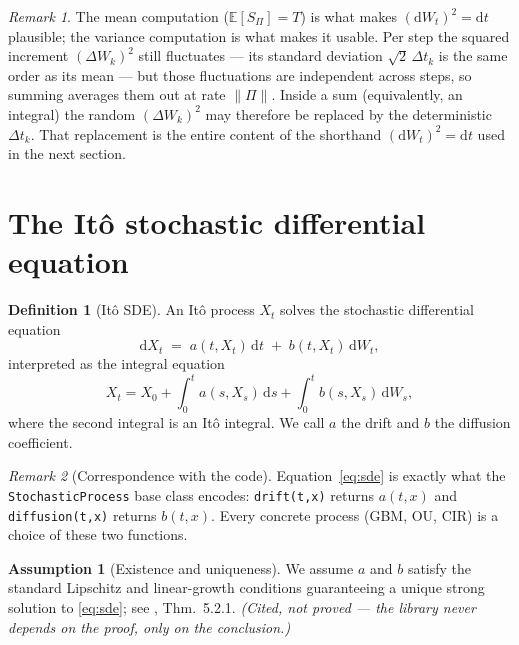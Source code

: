 \documentclass[11pt]{article}
\newcommand{\E}{\mathbb{E}}             %
\newcommand{\dd}{\mathrm{d}}           %
\newcommand{\dW}{\dd W_t}              %
\newcommand{\dt}{\dd t}                %
\newcommand{\drift}{a}                 %
\newcommand{\diff}{b}                  %
\theoremstyle{plain}
\theoremstyle{definition}
\newtheorem{definition}{Definition}
\newtheorem{assumption}{Assumption}
\theoremstyle{remark}
\newtheorem{remark}{Remark}
\begin{document}
\begin{remark}
The mean computation ($\E[S_\Pi]=T$) is what makes $(\dW)^2=\dt$
plausible; the variance computation is what makes it usable.
Per step the squared increment $(\Delta W_k)^2$ still fluctuates --- its
standard deviation $\sqrt2\,\Delta t_k$ is the same order as its mean --- but
those fluctuations are independent across steps, so summing averages them out
at rate $\|\Pi\|$. Inside a sum (equivalently, an integral) the random
$(\Delta W_k)^2$ may therefore be replaced by the deterministic $\Delta t_k$.
That replacement is the entire content of the shorthand $(\dW)^2=\dt$ used in
the next section.
\end{remark}

\section{The It\^o stochastic differential equation}

\begin{definition}[It\^o SDE]
An It\^o process $X_t$ solves the stochastic differential equation
\begin{equation}\label{eq:sde}
   \dd X_t \;=\; \drift(t,X_t)\,\dt \;+\; \diff(t,X_t)\,\dW,
\end{equation}
interpreted as the integral equation
\[
   X_t = X_0 + \int_0^t \drift(s,X_s)\,\dd s
              + \int_0^t \diff(s,X_s)\,\dd W_s,
\]
where the second integral is an It\^o integral. We call $\drift$ the
drift and $\diff$ the diffusion coefficient.
\end{definition}

\begin{remark}[Correspondence with the code]
Equation~\eqref{eq:sde} is exactly what the \texttt{StochasticProcess}
base class encodes: \texttt{drift(t,x)} returns $\drift(t,x)$ and
\texttt{diffusion(t,x)} returns $\diff(t,x)$. Every concrete process
(GBM, OU, CIR) is a choice of these two functions.
\end{remark}

\begin{assumption}[Existence and uniqueness]
We assume $\drift$ and $\diff$ satisfy the standard Lipschitz and
linear-growth conditions guaranteeing a unique strong solution to
\eqref{eq:sde}; see , Thm.~5.2.1. \emph{(Cited, not proved ---
the library never depends on the proof, only on the conclusion.)}
\end{assumption}
\end{document}
